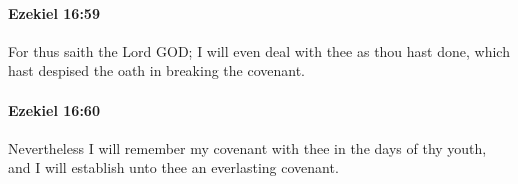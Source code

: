 		\paragraph{Ezekiel 16:59} %
			\label{EZEKIEL-16-59}

			For thus saith the Lord GOD; I will even deal with thee as thou hast done, which hast despised the oath in breaking the covenant.


		\paragraph{Ezekiel 16:60} %
			\label{EZEKIEL-16-60}

			Nevertheless I will remember my covenant with thee in the days of thy youth, and I will establish unto thee an everlasting covenant.


